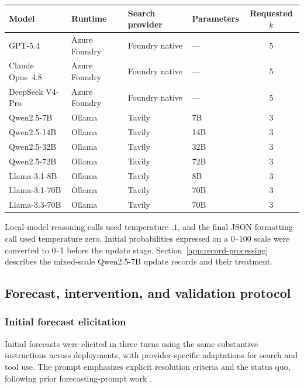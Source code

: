 \begin{center}
\begin{minipage}{\linewidth}
\centering
{}
\label{tab:agent-roster}
\small
\begin{tabular}{llllc}
\toprule
\textbf{Model} & \textbf{Runtime} & \textbf{Search provider} & \textbf{Parameters} & \textbf{Requested $k$} \\
\midrule
GPT-5.4          & Azure Foundry & Foundry native & --- & 5 \\
Claude Opus~4.8  & Azure Foundry & Foundry native & --- & 5 \\
DeepSeek V4-Pro  & Azure Foundry & Foundry native & --- & 5 \\
Qwen2.5-7B       & Ollama & Tavily & 7B  & 3 \\
Qwen2.5-14B      & Ollama & Tavily & 14B & 3 \\
Qwen2.5-32B      & Ollama & Tavily & 32B & 3 \\
Qwen2.5-72B      & Ollama & Tavily & 72B & 3 \\
Llama-3.1-8B     & Ollama & Tavily & 8B  & 3 \\
Llama-3.1-70B    & Ollama & Tavily & 70B & 3 \\
Llama-3.3-70B    & Ollama & Tavily & 70B & 3 \\
\bottomrule
\end{tabular}
\end{minipage}
\end{center}

Local-model reasoning calls used temperature $.1$, and the final JSON-formatting call used temperature zero.
Initial probabilities expressed on a 0--100 scale were converted to 0--1 before the update stage.
Section~\ref{app:record-processing} describes the mixed-scale Qwen2.5-7B update records and their treatment.

\subsection{Forecast, intervention, and validation protocol}
\label{app:exp1-protocol}

\subsubsection{Initial forecast elicitation}
\label{app:prompts}

Initial forecasts were elicited in three turns using the same substantive instructions across deployments, with provider-specific adaptations for search and tool use.
The prompt emphasizes explicit resolution criteria and the status quo, following prior forecasting-prompt work \citep{halawi2024approaching,wilson2025automated}.

